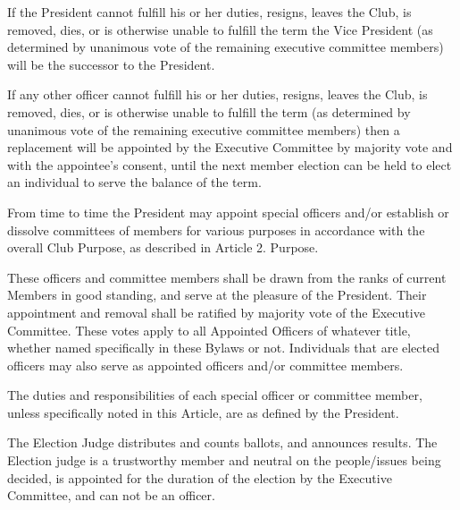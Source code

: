 \documentclass{bylaws}
\begin{document}
If the President cannot fulfill his or her duties, resigns, leaves the Club, is removed, dies, or is otherwise unable to fulfill the term the Vice President (as determined by unanimous vote of the remaining executive committee members) will be the successor to the President.

If any other officer cannot fulfill his or her duties, resigns, leaves the Club, is removed, dies, or is otherwise unable to fulfill the term (as determined by unanimous vote of the remaining executive committee members) then a replacement will be appointed by the Executive Committee by majority vote and with the appointee’s consent, until the next member election can be held to elect an individual to serve the balance of the term.


From time to time the President may appoint special officers and/or establish or dissolve committees of members for various purposes in accordance with the overall Club Purpose, as described in Article 2. Purpose. 

These officers and committee members shall be drawn from the ranks of current Members in good standing, and serve at the pleasure of the President. Their appointment and removal shall be ratified by majority vote of the Executive Committee. These votes apply to all Appointed Officers of whatever title, whether named specifically in these Bylaws or not. Individuals that are elected officers may also serve as appointed officers and/or committee members. 

The duties and responsibilities of each special officer or committee member, unless specifically noted in this Article, are as defined by the President. 

The Election Judge distributes and counts ballots, and announces results. The Election judge is a trustworthy member and neutral on the people/issues being decided, is appointed for the duration of the election by the Executive Committee, and can not be an officer. 


\end{document}
